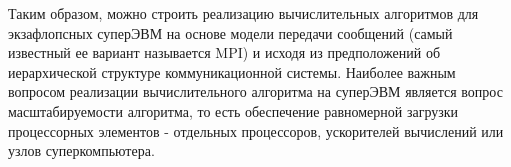 Таким образом, можно строить реализацию вычислительных алгоритмов для 
экзафлопсных суперЭВМ на основе модели передачи сообщений (самый известный ее вариант называется MPI) и исходя из предположений об иерархической структуре коммуникационной системы.
Наиболее важным вопросом реализации вычислительного алгоритма на суперЭВМ является вопрос масштабируемости алгоритма, то есть обеспечение равномерной загрузки процессорных элементов - отдельных процессоров, ускорителей вычислений или узлов суперкомпьютера.  




